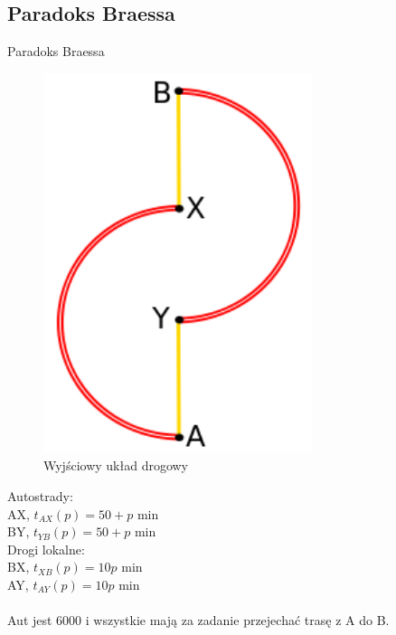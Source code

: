 \documentclass{beamer}
\begin{document}
\subsection{Paradoks Braessa }
\begin{frame}{Paradoks Braessa\cite{braess}}

\centering
\begin{minipage}{.48\textwidth}
\begin{figure}[h!]
\includegraphics[width=0.7\textwidth]{img/braess1}
\caption{Wyjściowy układ drogowy}
\end{figure}
\end{minipage}\hfill
\begin{minipage}{.48\textwidth}

Autostrady:\\
AX, $t_{AX}(p) =  50 + p$ min\\
BY, $t_{YB}(p) =  50 + p$ min\\

Drogi lokalne:\\
BX, $t_{XB}(p) =  10p$ min\\
AY, $t_{AY}(p) =  10p$ min\\
\\
Aut jest 6000 i wszystkie mają za zadanie przejechać trasę z A do B.

\end{minipage}\hfill

\end{frame}
\end{document}
